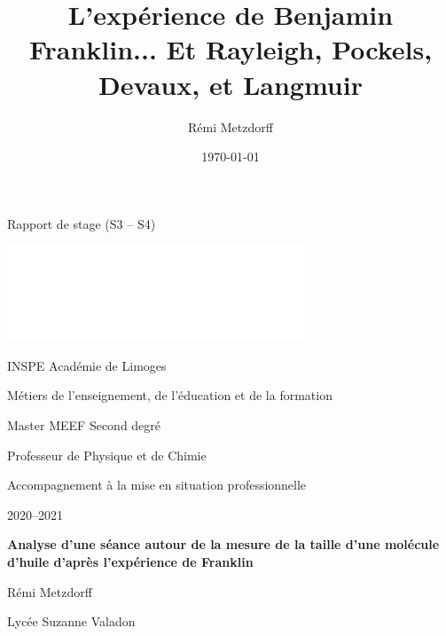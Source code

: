 \documentclass[12pt,a4paper, fleqn]{report}
\title{L'expérience de Benjamin Franklin... Et Rayleigh, Pockels, Devaux, et Langmuir}
\author{Rémi Metzdorff}
\date{\today}
\newenvironment{header}
{%
	\addcontentsline{ldf}{figure}{0}%
	\begin{header_env}\qquad\Large\bf}
	{\end{header_env}}
\begin{document}

\begin{header}
\begin{minipage}{0.55\textwidth}
Rapport de stage (S3 -- S4)
\end{minipage}
\begin{minipage}{0.38\textwidth}
\href{https://www.unilim.fr/}{\includegraphics[scale=1]{logo.png}}
\end{minipage}
\end{header}

\vspace{30pt}
\begin{spacing}{1.2}
{\bf
\begin{Large}
\noindent
\textcolor{gray_unilim}{INSPE Académie de Limoges}
\end{Large}

\begin{large}
\noindent
\textcolor{gray_unilim}{Métiers de l'enseignement, de l'éducation et de la formation}

\noindent
\textcolor{gray_unilim}{Master MEEF Second degré}

\noindent
\textcolor{gray_unilim}{Professeur de Physique et de Chimie}

\noindent
\textcolor{gray_unilim}{Accompagnement à la mise en situation professionnelle}

\end{large}
}

\vspace{20pt}

\noindent
\textcolor{gray_unilim}{2020--2021}

\vspace{40pt}
\begin{large}
\bf
\noindent
\textcolor{gray_unilim}{Analyse d'une séance autour de la mesure de la taille d'une molécule d'huile d'après l'expérience de Franklin}

\vspace{150pt}
\noindent
\textcolor{gray_unilim}{Rémi Metzdorff}

\noindent
\textcolor{gray_unilim}{Lycée Suzanne Valadon}
\end{large}
\end{spacing}
\end{document}
